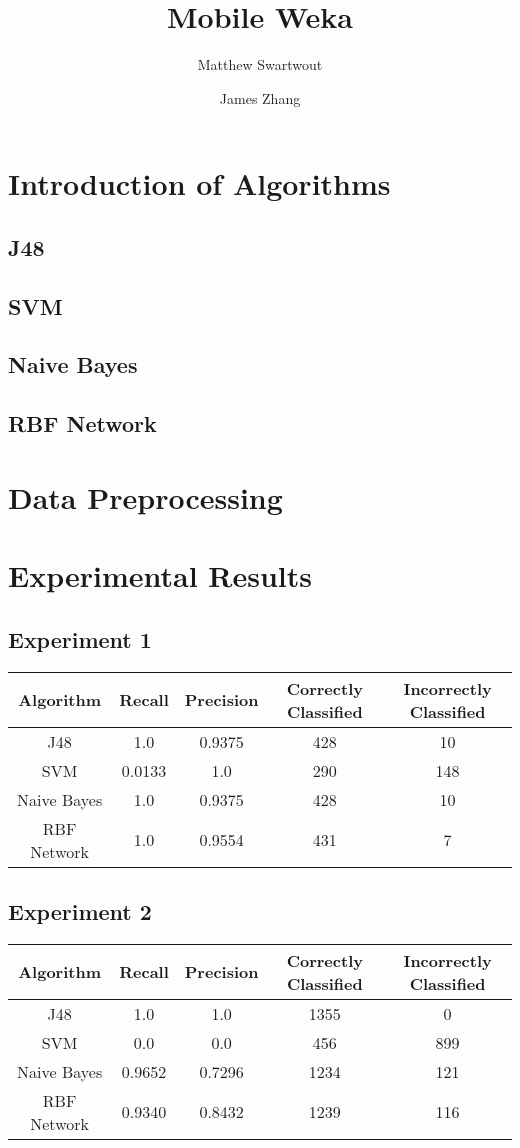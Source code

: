 \documentclass[]{article}
\title{Mobile Weka}
\author{Matthew Swartwout \and James Zhang}
\begin{document}
\maketitle

\section{Introduction of Algorithms}
\subsection{J48}
\subsection{SVM}
\subsection{Naive Bayes}
\subsection{RBF Network}

\section{Data Preprocessing}

\section{Experimental Results}
\subsection{Experiment 1}
\begin{tabular}{c | c | c| c | c}
Algorithm & Recall & Precision & Correctly Classified & Incorrectly Classified \\ \hline
J48 & 1.0 & 0.9375 & 428 & 10 \\ 
SVM & 0.0133 & 1.0 & 290 & 148 \\
Naive Bayes & 1.0 & 0.9375 &  428 & 10 \\
RBF Network & 1.0 & 0.9554 & 431 & 7 \\
\end{tabular}
\subsection{Experiment 2}
\begin{tabular}{c | c | c| c | c}
Algorithm & Recall & Precision & Correctly Classified & Incorrectly Classified \\ \hline
J48 & 1.0 & 1.0 & 1355 & 0 \\ 
SVM & 0.0 & 0.0 & 456 & 899 \\
Naive Bayes & 0.9652 & 0.7296 & 1234 & 121 \\
RBF Network & 0.9340 & 0.8432 & 1239 & 116 \\
\end{tabular}
\end{document}
